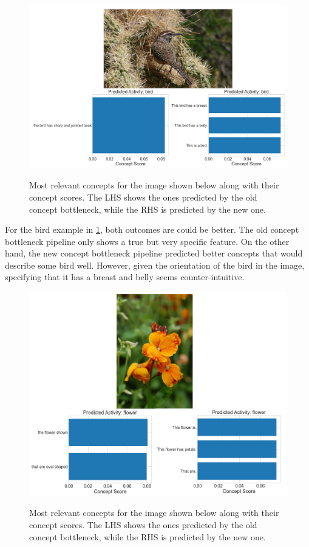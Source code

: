 \begin{figure}[h]
\caption{Most relevant concepts for the image shown below along with their concept scores. The LHS shows the ones predicted by the old concept bottleneck, while the RHS is predicted by the new one.}
\centering
\includegraphics[width=\textwidth]{concept-bottleneck-pipeline/birds_predictions.png}
\label{bird-concept-predictions}
\end{figure}

For the bird example in \ref{bird-concept-predictions}, both outcomes are could be better.
The old concept bottleneck pipeline only shows a true but very specific feature.
On the other hand, the new concept bottleneck pipeline predicted better concepts that would describe some bird well.
However, given the orientation of the bird in the image, specifying that it has a breast and belly seems counter-intuitive.

\begin{figure}[h]
\caption{Most relevant concepts for the image shown below along with their concept scores. The LHS shows the ones predicted by the old concept bottleneck, while the RHS is predicted by the new one.}
\centering
\includegraphics[width=\textwidth]{concept-bottleneck-pipeline/flower_predictions.png}
\label{flower-concept-predictions}
\end{figure}

